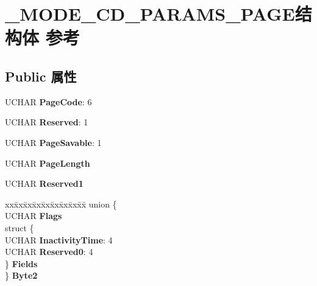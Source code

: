 \hypertarget{struct___m_o_d_e___c_d___p_a_r_a_m_s___p_a_g_e}{}\section{\+\_\+\+M\+O\+D\+E\+\_\+\+C\+D\+\_\+\+P\+A\+R\+A\+M\+S\+\_\+\+P\+A\+G\+E结构体 参考}
\label{struct___m_o_d_e___c_d___p_a_r_a_m_s___p_a_g_e}
\subsection*{Public 属性}
\begin{DoxyCompactItemize}
\item 
\mbox{\label{struct___m_o_d_e___c_d___p_a_r_a_m_s___p_a_g_e_ade7fbc270d73d079bcd2a734615d5655}} 
U\+C\+H\+AR {\bfseries Page\+Code}\+: 6
\item 
\mbox{\label{struct___m_o_d_e___c_d___p_a_r_a_m_s___p_a_g_e_a6024d5b7441e594178c59612634b50ca}} 
U\+C\+H\+AR {\bfseries Reserved}\+: 1
\item 
\mbox{\label{struct___m_o_d_e___c_d___p_a_r_a_m_s___p_a_g_e_ae863bb593e107b59db45db7d1b05506c}} 
U\+C\+H\+AR {\bfseries Page\+Savable}\+: 1
\item 
\mbox{\label{struct___m_o_d_e___c_d___p_a_r_a_m_s___p_a_g_e_a63dc60ad29d11c2af43c788f0d07da29}} 
U\+C\+H\+AR {\bfseries Page\+Length}
\item 
\mbox{\label{struct___m_o_d_e___c_d___p_a_r_a_m_s___p_a_g_e_a352bb8093ca0dcbb15683ec1c5e34e8c}} 
U\+C\+H\+AR {\bfseries Reserved1}
\item 
\mbox{\label{struct___m_o_d_e___c_d___p_a_r_a_m_s___p_a_g_e_af4e75f6e25aad59888b858204d78eb3a}} 
\begin{tabbing}
xx\=xx\=xx\=xx\=xx\=xx\=xx\=xx\=xx\=\kill
union \{\\
\>UCHAR {\bfseries Flags}\\
\>struct \{\\
\>\>UCHAR {\bfseries InactivityTime}: 4\\
\>\>UCHAR {\bfseries Reserved0}: 4\\
\>\} {\bfseries Fields}\\
\} {\bfseries Byte2}\\


\end{tabbing}
\end{DoxyCompactItemize}
